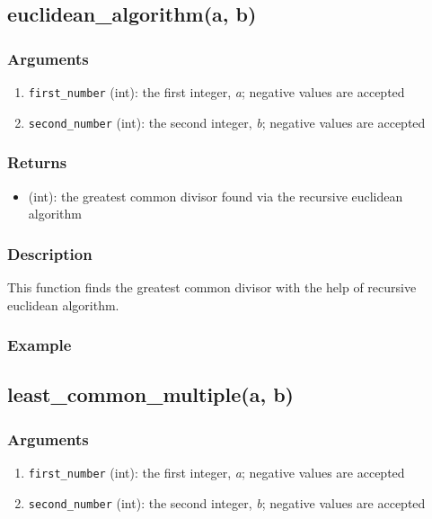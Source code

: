 \documentclass[refman]{scrartcl}
\begin{document}
\subsection{euclidean\_algorithm(a, b)}

\subsubsection*{Arguments}

\begin{enumerate}
  \item \texttt{first\_number} (int): the first integer, \textit{a}; negative values are accepted
  \item \texttt{second\_number} (int): the second integer, \textit{b}; negative values are accepted
\end{enumerate}

\subsubsection*{Returns}

\begin{itemize}
  \item (int): the greatest common divisor found via the recursive euclidean algorithm
\end{itemize}

\subsubsection*{Description}

This function finds the greatest common divisor with the help of recursive euclidean algorithm.


\subsubsection*{Example}

\subsection{least\_common\_multiple(a, b)}

\subsubsection*{Arguments}

\begin{enumerate}
  \item \texttt{first\_number} (int): the first integer, \textit{a}; negative values are accepted
  \item \texttt{second\_number} (int): the second integer, \textit{b}; negative values are accepted
\end{enumerate}
\end{document}
